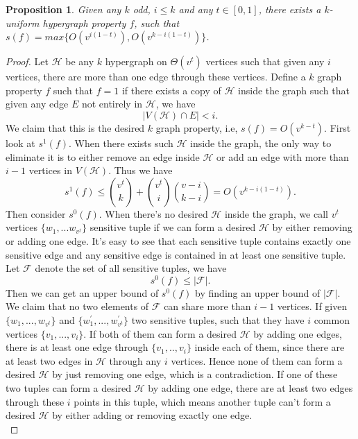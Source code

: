 \documentclass[psamsfonts]{amsart}
\newtheorem{prop}[theorem]{Proposition}
\theoremstyle{definition}
\theoremstyle{remark}
\numberwithin{equation}{section}
\begin{document}
	\begin{prop}
		Given any $k$ odd, $i \leq k$ and any $t \in [0,1]$, there exists a $k$-uniform hypergraph property $f$, such that $s(f) = max\{O(v^{i(1-t)}), O(v^{k-i(1-t)})\}$.
	\end{prop}
	\begin{proof}
		Let $\mathcal{H}$ be any $k$ hypergraph on $\Theta(v^t)$ vertices such that given any $i$ vertices, there are more than one edge through these vertices. Define a $k$ graph property $f$ such that $f=1$ if there exists a copy of $\mathcal{H}$ inside the graph such that given any edge $E$ not entirely in $\mathcal{H}$, we have
		\begin{equation}
			|V(\mathcal{H}) \cap E| < i. \nonumber
		\end{equation}
		\indent We claim that this is the desired $k$ graph property, i.e, $s(f) = O(v^{k-t})$. First look at $s^1(f)$. When there exists such $\mathcal{H}$ inside the graph, the only way to eliminate it is to either remove an edge inside $\mathcal{H}$ or add an edge with more than $i-1$ vertices in $V(\mathcal{H})$. Thus we have
		\begin{equation}
			s^1(f) \leq {v^t \choose{k}} + {v^t \choose{i}}{v-i \choose{k-i}} = O(v^{k-i(1-t)}). \nonumber
		\end{equation}
		Then consider $s^0(f)$. When there's no desired $\mathcal{H}$ inside the graph, we call $v^t$ vertices $\{w_1,...w_{v^t}\}$ sensitive tuple if we can form a desired $\mathcal{H}$ by either removing or adding one edge. It's easy to see that each sensitive tuple contains exactly one sensitive edge and any sensitive edge is contained in at least one sensitive tuple. Let $\mathcal{F}$ denote the set of all sensitive tuples, we have
		\begin{equation}
			s^0(f) \leq |\mathcal{F}|. \nonumber
		\end{equation}
		Then we can get an upper bound of $s^0(f)$ by finding an upper bound of $|\mathcal{F}|$. We claim that no two elements of $\mathcal{F}$ can share more than $i-1$ vertices. If given $\{w_1,...,w_{v^t}\}$ and $\{w_1^\prime,...,w_{v^t}^\prime\}$ two sensitive tuples, such that they have $i$ common vertices $\{v_1,...,v_i\}$. If both of them can form a desired $\mathcal{H}$ by adding one edges, there is at least one edge through $\{v_1,..,v_i\}$ inside each of them, since there are at least two edges in $\mathcal{H}$ through any $i$ vertices. Hence none of them can form a desired $\mathcal{H}$ by just removing one edge, which is a contradiction. If one of these two tuples can form a desired $\mathcal{H}$ by adding one edge, there are at least two edges through these $i$ points in this tuple, which means another tuple can't form a desired $\mathcal{H}$ by either adding or removing exactly one edge.\\

\end{proof}
\end{document}
